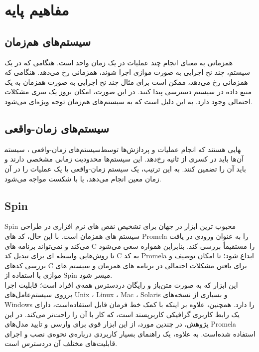 \chapter{مفاهیم پایه}

\section{سیستم‌های هم‌زمان}
همزمانی به معنای انجام چند عملیات در یک زمان واحد است. هنگامی که در یک سیستم، چند نخ اجرایی به صورت موازی  اجرا شوند، همزمانی رخ می‌دهد. هنگامی که همزمانی رخ می‌دهد، ممکن است برای مثال چند نخ اجرایی به صورت همزمان  به یک منبع داده در سیستم دسترسی پیدا کنند. در این صورت، امکان بروز یک سری مشکلات احتمالی وجود دارد. به این دلیل است که به سیستم‌های هم‌زمان توجه ویژه‌ای می‌شود.

\section{سیستم‌های زمان-واقعی}
سیستم‌های زمان-واقعی ، سیستم‎هایی هستند که انجام عملیات و پردازش‌ها توسط آن‌ها باید در کسری از ثانیه رخ‌دهد. این سیستم‌ها محدودیت زمانی مشخصی دارند و باید آن را تضمین کنند. به این ترتیب، یک سیستم زمان-واقعی یا یک عملیات را در آن زمان معین انجام می‌دهد، یا با شکست  مواجه می‌شود.

\section{Spin}
Spin \cite{1} محبوب ترین ابزار در جهان برای تشخیص نقص های نرم افزاری در طراحی سیستم های همزمان است. با این حال، کد های Promela را به عنوان ورودی در یافت می‌کند و نمی‌تواند برنامه های C را مستقیماً بررسی کند. بنابراین همواره سعی می‌شود تا روش‌هایی واسطه ای برای تبدیل کد C به کد Promela ابداع شود؛ تا امکان توصیف و بررسی کدهای C برای یافتن مشکلات احتمالی در برنامه های همزمان و سیستم های موازی با استفاده از Spin میسر شود.
\\
این ابزار که به صورت متن‌باز  و رایگان دردسترس همه‌ی افراد است؛ قابلیت اجرا برروی سیستم‌عامل‌های Unix ، Linux ، Mac ، Solaris و بسیاری از نسخه‌های Windows را دارد. همچنین، علاوه بر اینکه با کمک خط فرمان  قابل استفاده‌است، دارای یک رابط کاربری گرافیکی کاربرپسند  است، که کار با آن را راحت‌تر می‌کند. در این پژوهش، در چندین مورد، از این ابزار قوی برای وارسی و تایید  مدل‌های Promela استفاده شده‌است. به علاوه، یک راهنمای بسیار کاربردی درباره‌ی نحوه‌ی نصب و اجرای قابلیت‌های مختلف آن دردسترس ‌است.

